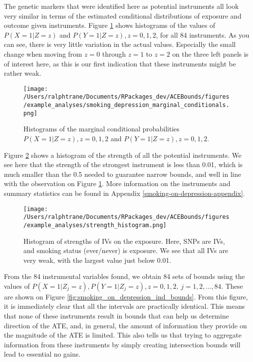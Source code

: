 \documentclass[
]{article}
\theoremstyle{plain}
\begin{document}
The genetic markers that were identified here as potential instruments all look very similar in terms of the estimated conditional distributions of exposure and outcome given instruments. Figure \ref{fig:smoking_on_depression_marginals} shows histograms of the values of \(P(X = 1|Z = z)\) and \(P(Y = 1|Z = z), z = 0,1,2\), for all 84 instruments. As you can see, there is very little variation in the actual values. Especially the small change when moving from \(z = 0\) through \(z = 1\) to \(z = 2\) on the three left panels is of interest here, as this is our first indication that these instruments might be rather weak.

\begin{figure}[H]
  \texttt{[image: /Users/ralphtrane/Documents/RPackages\_dev/ACEBounds/figures/example\_analyses/smoking\_depression\_marginal\_conditionals.png]}
  \caption{Histograms of the marginal conditional probabilities $P(X = 1 | Z = z), z = 0,1,2$ and $P(Y = 1 | Z = z), z=0,1,2$.}
  \label{fig:smoking_on_depression_marginals}
\end{figure}

Figure \ref{fig:strength_histogram} shows a histogram of the strength of all the potential instruments. We see here that the strength of the strongest instrument is less than 0.01, which is much smaller than the 0.5 needed to guarantee narrow bounds, and well in line with the observation on Figure \ref{fig:smoking_on_depression_marginals}. More information on the instruments and summary statistics can be found in Appendix \ref{smoking-on-depression-appendix}.

\begin{figure}[H]
  \center
  \texttt{[image: /Users/ralphtrane/Documents/RPackages\_dev/ACEBounds/figures/example\_analyses/strength\_histogram.png]}
  \caption{Histogram of strengths of IVs on the exposure. Here, SNPs are IVs, and smoking status (ever/never) is exposure. We see that all IVs are very weak, with the largest value just below 0.01.}
  \label{fig:strength_histogram}
\end{figure}

From the 84 instrumental variables found, we obtain 84 sets of bounds using the values of \(P(X = 1 | Z_j = z), P(Y = 1 | Z_j = z), z = 0,1,2,\ j=1,2,...,84\). These are shown on Figure \ref{fig:smoking_on_depression_ind_bounds}. From this figure, it is immediately clear that all the intervals are practically identical. This means that none of these instruments result in bounds that can help us determine direction of the ATE, and, in general, the amount of information they provide on the magnitude of the ATE is limited. This also tells us that trying to aggregate information from these instruments by simply creating intersection bounds will lead to essential no gains.
\end{document}
